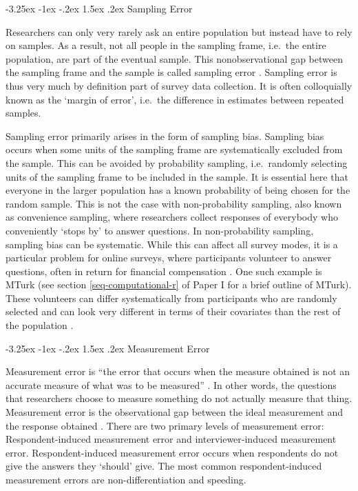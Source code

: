 \documentclass[12pt,]{article}
\makeatletter
\renewcommand\paragraph{\@startsection{paragraph}{4}{\z@}
                                    {-3.25ex \@plus -1ex \@minus -.2ex}
                                    {1.5ex \@plus .2ex}
                                    {\normalsize}} %
\makeatother
\begin{document}
\paragraph{Sampling Error}\label{mode-theory-types-sampling}

Researchers can only very rarely ask an entire population but instead
have to rely on samples. As a result, not all people in the sampling
frame, i.e.~the entire population, are part of the eventual sample. This
nonobservational gap between the sampling frame and the sample is called
sampling error \citep{groves_survey_2009}. Sampling error is thus very
much by definition part of survey data collection. It is often
colloquially known as the `margin of error', i.e.~the difference in
estimates between repeated samples.

Sampling error primarily arises in the form of sampling bias. Sampling
bias occurs when some units of the sampling frame are systematically
excluded from the sample. This can be avoided by probability sampling,
i.e.~randomly selecting units of the sampling frame to be included in
the sample. It is essential here that everyone in the larger population
has a known probability of being chosen for the random sample. This is
not the case with non-probability sampling, also known as convenience
sampling, where researchers collect responses of everybody who
conveniently `stops by' to answer questions. In non-probability
sampling, sampling bias can be systematic. While this can affect all
survey modes, it is a particular problem for online surveys, where
participants volunteer to answer questions, often in return for
financial compensation \citep{ansolabehere_2014_does}. One such example
is MTurk (see section \ref{seq-computational-r} of Paper I for a brief
outline of MTurk). These volunteers can differ systematically from
participants who are randomly selected and can look very different in
terms of their covariates than the rest of the population
\citep{dillman_2014_internet, couper_2000_surveys, hays_2015_internet, alvarez_2003_subject}.

\paragraph{Measurement Error}\label{mode-theory-types-measurement}

Measurement error is ``the error that occurs when the measure obtained
is not an accurate measure of what was to be measured''
\citep[p.~18]{weisberg_2005_total}. In other words, the questions that
researchers choose to measure something do not actually measure that
thing. Measurement error is the observational gap between the ideal
measurement and the response obtained \citep{groves_survey_2009}. There
are two primary levels of measurement error: Respondent-induced
measurement error and interviewer-induced measurement error.
Respondent-induced measurement error occurs when respondents do not give
the answers they `should' give. The most common respondent-induced
measurement errors are non-differentiation and speeding.
\end{document}

